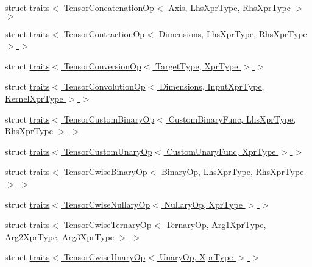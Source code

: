 \begin{DoxyCompactItemize}
\item 
struct \hyperlink{struct_eigen_1_1internal_1_1traits_3_01_tensor_concatenation_op_3_01_axis_00_01_lhs_xpr_type_00_01_rhs_xpr_type_01_4_01_4}{traits$<$ Tensor\+Concatenation\+Op$<$ Axis, Lhs\+Xpr\+Type, Rhs\+Xpr\+Type $>$ $>$}
\item 
struct \hyperlink{struct_eigen_1_1internal_1_1traits_3_01_tensor_contraction_op_3_01_dimensions_00_01_lhs_xpr_type_00_01_rhs_xpr_type_01_4_01_4}{traits$<$ Tensor\+Contraction\+Op$<$ Dimensions, Lhs\+Xpr\+Type, Rhs\+Xpr\+Type $>$ $>$}
\item 
struct \hyperlink{struct_eigen_1_1internal_1_1traits_3_01_tensor_conversion_op_3_01_target_type_00_01_xpr_type_01_4_01_4}{traits$<$ Tensor\+Conversion\+Op$<$ Target\+Type, Xpr\+Type $>$ $>$}
\item 
struct \hyperlink{struct_eigen_1_1internal_1_1traits_3_01_tensor_convolution_op_3_01_dimensions_00_01_input_xpr_tyede4d3ebe1b8839795edc93275eed3f9}{traits$<$ Tensor\+Convolution\+Op$<$ Dimensions, Input\+Xpr\+Type, Kernel\+Xpr\+Type $>$ $>$}
\item 
struct \hyperlink{struct_eigen_1_1internal_1_1traits_3_01_tensor_custom_binary_op_3_01_custom_binary_func_00_01_lh13ec16c8467537dd695eeaba8e396b16}{traits$<$ Tensor\+Custom\+Binary\+Op$<$ Custom\+Binary\+Func, Lhs\+Xpr\+Type, Rhs\+Xpr\+Type $>$ $>$}
\item 
struct \hyperlink{struct_eigen_1_1internal_1_1traits_3_01_tensor_custom_unary_op_3_01_custom_unary_func_00_01_xpr_type_01_4_01_4}{traits$<$ Tensor\+Custom\+Unary\+Op$<$ Custom\+Unary\+Func, Xpr\+Type $>$ $>$}
\item 
struct \hyperlink{struct_eigen_1_1internal_1_1traits_3_01_tensor_cwise_binary_op_3_01_binary_op_00_01_lhs_xpr_type_00_01_rhs_xpr_type_01_4_01_4}{traits$<$ Tensor\+Cwise\+Binary\+Op$<$ Binary\+Op, Lhs\+Xpr\+Type, Rhs\+Xpr\+Type $>$ $>$}
\item 
struct \hyperlink{struct_eigen_1_1internal_1_1traits_3_01_tensor_cwise_nullary_op_3_01_nullary_op_00_01_xpr_type_01_4_01_4}{traits$<$ Tensor\+Cwise\+Nullary\+Op$<$ Nullary\+Op, Xpr\+Type $>$ $>$}
\item 
struct \hyperlink{struct_eigen_1_1internal_1_1traits_3_01_tensor_cwise_ternary_op_3_01_ternary_op_00_01_arg1_xpr_tfaef9778449e83c93f69e5312efba568}{traits$<$ Tensor\+Cwise\+Ternary\+Op$<$ Ternary\+Op, Arg1\+Xpr\+Type, Arg2\+Xpr\+Type, Arg3\+Xpr\+Type $>$ $>$}
\item 
struct \hyperlink{struct_eigen_1_1internal_1_1traits_3_01_tensor_cwise_unary_op_3_01_unary_op_00_01_xpr_type_01_4_01_4}{traits$<$ Tensor\+Cwise\+Unary\+Op$<$ Unary\+Op, Xpr\+Type $>$ $>$}

\end{DoxyCompactItemize}
